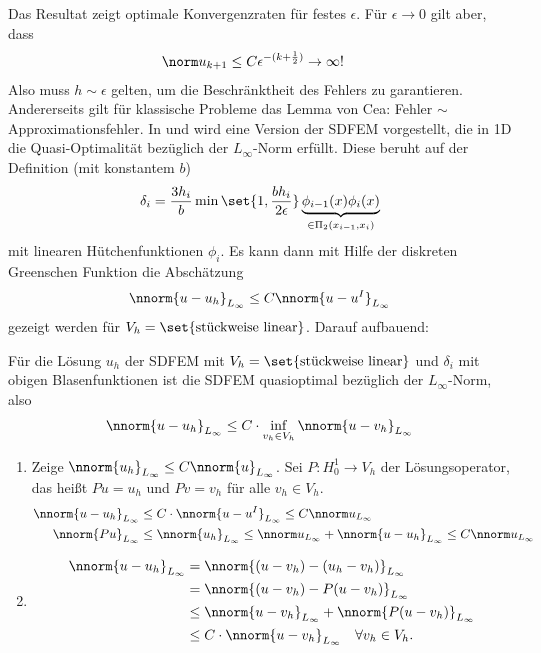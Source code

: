 Das Resultat zeigt optimale Konvergenzraten für festes $\epsilon$. Für $\epsilon \to 0$ gilt aber, dass
\begin{align*}
  \norm u_{k+1} &\leq C \epsilon^{- (k+ \frac 12)} \to \infty!
\end{align*}
Also muss $h \sim \epsilon$ gelten, um die Beschränktheit des Fehlers zu garantieren. Andererseits gilt für klassische Probleme das Lemma von Cea: Fehler $\sim$ Approximationsfehler. 
In \cite{CX_CM} und \cite{CX_NM} wird eine Version der SDFEM vorgestellt, die in 1D die Quasi-Optimalität bezüglich der $L_{\infty}$-Norm erfüllt. Diese beruht auf der Definition (mit konstantem $b$)
\begin{align*}
  \delta_{i} = \frac {3h_{i}} b \min \set{1, \frac{bh_{i}}{2\epsilon}}\underbrace{\phi_{i-1}(x) \phi_{i}(x)}_{\in \Pi_{2}(x_{i-1}, x_{i})}
\end{align*}
mit linearen Hütchenfunktionen $\phi_{i}$. Es kann dann mit Hilfe der diskreten Greenschen Funktion die Abschätzung
\begin{align*}
  \nnorm{u-u_{h}}_{L_{\infty}} \leq C  \nnorm{u-u^{I}}_{L_{\infty}} 
\end{align*}
gezeigt werden für $V_{h} = \set{\text{stückweise linear}}$. 
Darauf aufbauend:
\begin{satz}\label{thm:6-8}
  Für die Lösung $u_{h}$ der SDFEM mit $V_{h} = \set{\text{stückweise linear}}$ und $\delta_{i}$ mit obigen Blasenfunktionen ist die SDFEM quasioptimal bezüglich der $L_{\infty}$-Norm, also
  \begin{align*}
    \nnorm{u-u_{h}}_{L_{\infty}} \leq C\cdot \inf_{v_{h} \in V_{h}} \nnorm{u - v_{h}}_{L_{\infty}}
  \end{align*}
\end{satz}
\begin{beweis}
  \begin{enumerate}
  \item Zeige $\nnorm {u_{h}}_{L_{\infty}} \leq C \nnorm {u}_{L_{\infty}}$. 
    Sei $P: H_{0}^{1} \to V_{h}$ der Lösungsoperator, das heißt $Pu= u_{h}$ und $Pv= v_{h}$ für alle $v_{h} \in V_{h}$. 
    \begin{align*}
      \nnorm{u-u_{h}}_{L_{\infty}} &\leq C\cdot  \nnorm{u - u^{I}}_{L_{\infty}} \leq C \nnorm u _{L_{\infty}}\\
      \nnorm{Pu}_{L_{\infty}} &\leq \nnorm{u_{h}}_{L_{\infty}} \leq \nnorm u_{L_{\infty}}  + \nnorm{u - u_{h}}_{L_{\infty}} \leq C \nnorm u _{L_{\infty}}\\
    \end{align*}
  \item
    \begin{align*}
      \nnorm{u-u_{h}}_{L_{\infty}} &= \nnorm{(u - v_{h}) - (u_{h} - v_{h})}_{L_{\infty}}\\
      &= \nnorm{(u - v_{h}) - P(u - v_{h})}_{L_{\infty}}\\
      &\leq \nnorm{u - v_{h}}_{L_{\infty}} + \nnorm{P(u - v_{h})}_{L_{\infty}}\\
      &\leq C \cdot\nnorm{u - v_{h}}_{L_{\infty}} \quad \forall v_{h} \in V_{h}. 
    \end{align*}
  \end{enumerate}
\end{beweis}
